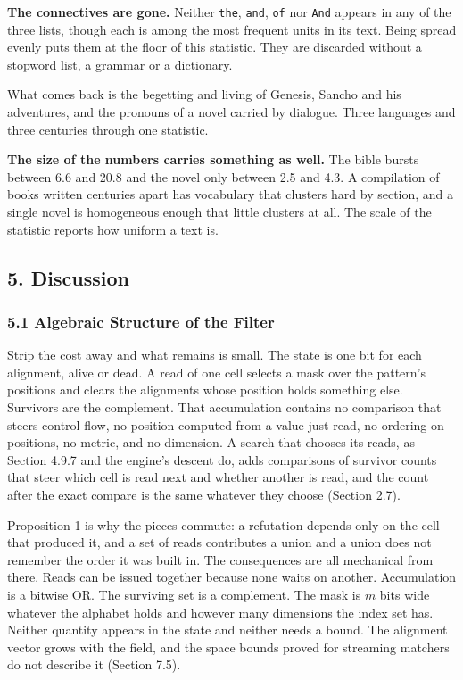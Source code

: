 \noindent\textbf{The connectives are gone.} Neither \texttt{the}, \texttt{and}, \texttt{of} nor \texttt{And} appears in any of the three lists, though each is among the most frequent units in its text. Being spread evenly puts them at the floor of this statistic. They are discarded without a stopword list, a grammar or a dictionary.

What comes back is the begetting and living of Genesis, Sancho and his adventures, and the pronouns of a novel carried by dialogue. Three languages and three centuries through one statistic.

\noindent\textbf{The size of the numbers carries something as well.} The bible bursts between 6.6 and 20.8 and the novel only between 2.5 and 4.3. A compilation of books written centuries apart has vocabulary that clusters hard by section, and a single novel is homogeneous enough that little clusters at all. The scale of the statistic reports how uniform a text is.

\subsection{5. Discussion}

\subsubsection{5.1 Algebraic Structure of the Filter}

Strip the cost away and what remains is small. The state is one bit for each alignment, alive or dead. A read of one cell selects a mask over the pattern's positions and clears the alignments whose position holds something else. Survivors are the complement. That accumulation contains no comparison that steers control flow, no position computed from a value just read, no ordering on positions, no metric, and no dimension. A search that chooses its reads, as Section 4.9.7 and the engine's descent do, adds comparisons of survivor counts that steer which cell is read next and whether another is read, and the count after the exact compare is the same whatever they choose (Section 2.7).

Proposition 1 is why the pieces commute: a refutation depends only on the cell that produced it, and a set of reads contributes a union and a union does not remember the order it was built in. The consequences are all mechanical from there. Reads can be issued together because none waits on another. Accumulation is a bitwise OR. The surviving set is a complement. The mask is \(m\) bits wide whatever the alphabet holds and however many dimensions the index set has. Neither quantity appears in the state and neither needs a bound. The alignment vector grows with the field, and the space bounds proved for streaming matchers do not describe it (Section 7.5).

